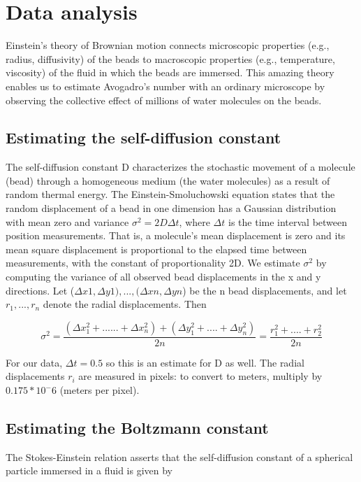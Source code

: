 \documentclass[]{article}
\begin{document}
\section{Data analysis}
Einstein's theory of Brownian motion connects microscopic properties (e.g., radius, diffusivity) of the beads to macroscopic properties (e.g., temperature, viscosity) of the fluid in which the beads are immersed. This amazing theory enables us to estimate Avogadro's number with an ordinary microscope by observing the collective effect of millions of water molecules on the beads.
 
 \subsection{Estimating the self-diffusion constant}
 The self-diffusion constant D characterizes the stochastic movement of a molecule (bead) through a homogeneous medium (the water molecules) as a result of random thermal energy. The Einstein-Smoluchowski equation states that the random displacement of a bead in one dimension has a Gaussian distribution with mean zero and variance $\sigma^2 = 2 D \Delta t$, where $\Delta t$ is the time interval between position measurements. That is, a molecule's mean displacement is zero and its mean square displacement is proportional to the elapsed time between measurements, with the constant of proportionality 2D. We estimate $\sigma^2$ by computing the variance of all observed bead displacements in the x and y directions. Let ($\Delta x1, \Delta y1), ..., (\Delta xn, \Delta yn$) be the n bead displacements, and let $r_1, ..., r_n$ denote the radial displacements. Then

 \begin{equation}
     \sigma^2= \frac{(\Delta x_1^2+...... +\Delta x_n^2) + (\Delta y_1^2+....+\Delta y_n^2)}{2n}
     = \frac{r_1^2+....+r_2^2}{2n}
 \end{equation}

 For our data, $\Delta t = 0.5$ so this is an estimate for D as well. The radial displacements $r_i$ are measured in pixels: to convert to meters, multiply by $0.175 * 10^-6$ (meters per pixel).

\subsection{Estimating the Boltzmann constant}
 The Stokes-Einstein relation asserts that the self-diffusion constant of a spherical particle immersed in a fluid is given by
\end{document}
